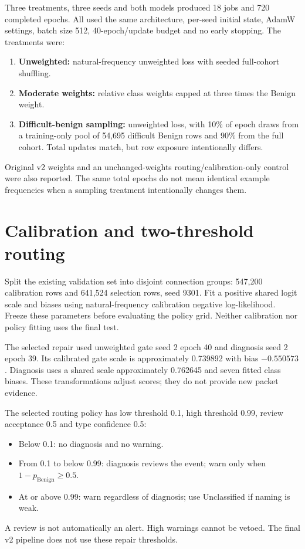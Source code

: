 \documentclass[11pt,a4paper,oneside]{report}
\begin{document}
Three treatments, three seeds and both models produced 18 jobs and 720 completed epochs. All used the same architecture, per-seed initial state, AdamW settings, batch size 512, 40-epoch/update budget and no early stopping. The treatments were:
\begin{enumerate}
\item \textbf{Unweighted:} natural-frequency unweighted loss with seeded full-cohort shuffling.
\item \textbf{Moderate weights:} relative class weights capped at three times the Benign weight.
\item \textbf{Difficult-benign sampling:} unweighted loss, with 10\% of epoch draws from a training-only pool of 54,695 difficult Benign rows and 90\% from the full cohort. Total updates match, but row exposure intentionally differs.
\end{enumerate}
Original v2 weights and an unchanged-weights routing/calibration-only control were also reported. The same total epochs do not mean identical example frequencies when a sampling treatment intentionally changes them.

\section{Calibration and two-threshold routing}
Split the existing validation set into disjoint connection groups: 547,200 calibration rows and 641,524 selection rows, seed 9301. Fit a positive shared logit scale and biases using natural-frequency calibration negative log-likelihood. Freeze these parameters before evaluating the policy grid. Neither calibration nor policy fitting uses the final test.

The selected repair used unweighted gate seed 2 epoch 40 and diagnosis seed 2 epoch 39. Its calibrated gate scale is approximately 0.739892 with bias $-0.550573$. Diagnosis uses a shared scale approximately 0.762645 and seven fitted class biases. These transformations adjust scores; they do not provide new packet evidence.

The selected routing policy has low threshold 0.1, high threshold 0.99, review acceptance 0.5 and type confidence 0.5:
\begin{itemize}
\item Below 0.1: no diagnosis and no warning.
\item From 0.1 to below 0.99: diagnosis reviews the event; warn only when $1-p_{\mathrm{Benign}}\geq0.5$.
\item At or above 0.99: warn regardless of diagnosis; use Unclassified if naming is weak.
\end{itemize}
A review is not automatically an alert. High warnings cannot be vetoed. The final v2 pipeline does not use these repair thresholds.
\end{document}
